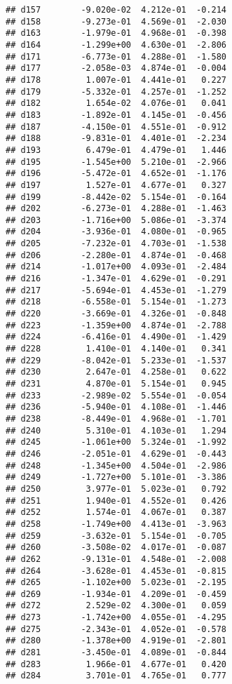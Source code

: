 \documentclass[
]{article}
\begin{document}
\begin{verbatim}
## d157        -9.020e-02  4.212e-01  -0.214
## d158        -9.273e-01  4.569e-01  -2.030
## d163        -1.979e-01  4.968e-01  -0.398
## d164        -1.299e+00  4.630e-01  -2.806
## d171        -6.773e-01  4.288e-01  -1.580
## d177        -2.058e-03  4.874e-01  -0.004
## d178         1.007e-01  4.441e-01   0.227
## d179        -5.332e-01  4.257e-01  -1.252
## d182         1.654e-02  4.076e-01   0.041
## d183        -1.892e-01  4.145e-01  -0.456
## d187        -4.150e-01  4.551e-01  -0.912
## d188        -9.831e-01  4.401e-01  -2.234
## d193         6.479e-01  4.479e-01   1.446
## d195        -1.545e+00  5.210e-01  -2.966
## d196        -5.472e-01  4.652e-01  -1.176
## d197         1.527e-01  4.677e-01   0.327
## d199        -8.442e-02  5.154e-01  -0.164
## d202        -6.273e-01  4.288e-01  -1.463
## d203        -1.716e+00  5.086e-01  -3.374
## d204        -3.936e-01  4.080e-01  -0.965
## d205        -7.232e-01  4.703e-01  -1.538
## d206        -2.280e-01  4.874e-01  -0.468
## d214        -1.017e+00  4.093e-01  -2.484
## d216        -1.347e-01  4.629e-01  -0.291
## d217        -5.694e-01  4.453e-01  -1.279
## d218        -6.558e-01  5.154e-01  -1.273
## d220        -3.669e-01  4.326e-01  -0.848
## d223        -1.359e+00  4.874e-01  -2.788
## d224        -6.416e-01  4.490e-01  -1.429
## d228         1.410e-01  4.140e-01   0.341
## d229        -8.042e-01  5.233e-01  -1.537
## d230         2.647e-01  4.258e-01   0.622
## d231         4.870e-01  5.154e-01   0.945
## d233        -2.989e-02  5.554e-01  -0.054
## d236        -5.940e-01  4.108e-01  -1.446
## d238        -8.449e-01  4.968e-01  -1.701
## d240         5.310e-01  4.103e-01   1.294
## d245        -1.061e+00  5.324e-01  -1.992
## d246        -2.051e-01  4.629e-01  -0.443
## d248        -1.345e+00  4.504e-01  -2.986
## d249        -1.727e+00  5.101e-01  -3.386
## d250         3.977e-01  5.023e-01   0.792
## d251         1.940e-01  4.552e-01   0.426
## d252         1.574e-01  4.067e-01   0.387
## d258        -1.749e+00  4.413e-01  -3.963
## d259        -3.632e-01  5.154e-01  -0.705
## d260        -3.508e-02  4.017e-01  -0.087
## d262        -9.131e-01  4.548e-01  -2.008
## d264        -3.628e-01  4.453e-01  -0.815
## d265        -1.102e+00  5.023e-01  -2.195
## d269        -1.934e-01  4.209e-01  -0.459
## d272         2.529e-02  4.300e-01   0.059
## d273        -1.742e+00  4.055e-01  -4.295
## d275        -2.343e-01  4.052e-01  -0.578
## d280        -1.378e+00  4.919e-01  -2.801
## d281        -3.450e-01  4.089e-01  -0.844
## d283         1.966e-01  4.677e-01   0.420
## d284         3.701e-01  4.765e-01   0.777

\end{verbatim}
\end{document}
